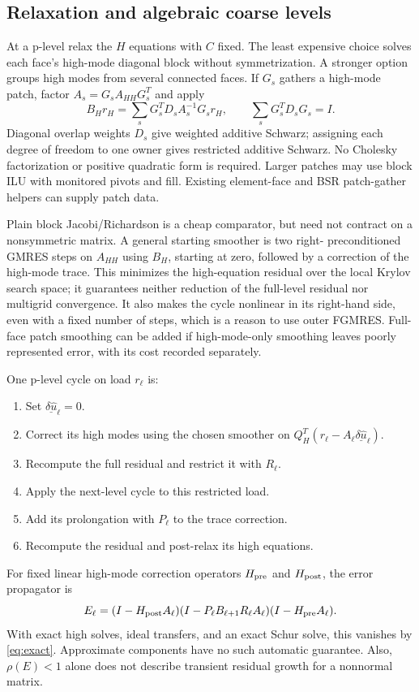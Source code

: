 \documentclass[11pt]{article}
\numberwithin{equation}{section}
\numberwithin{figure}{section}
\numberwithin{table}{section}
\begin{document}
\subsection{Relaxation and algebraic coarse levels}
At a p-level relax the $H$ equations with $C$ fixed. The least expensive
choice solves each face's high-mode diagonal block without symmetrization.
A stronger option groups high modes from several connected faces.
If $G_s$ gathers a high-mode patch, factor
$A_s=G_sA_{HH}G_s^T$ and apply
\[
 B_Hr_H=\sum_s G_s^TD_s A_s^{-1}G_sr_H,\qquad
 \sum_s G_s^TD_sG_s=I.
\]
Diagonal overlap weights $D_s$ give weighted additive Schwarz; assigning
each degree of freedom to one owner gives restricted additive Schwarz.
No Cholesky factorization or positive quadratic form is required.
Larger patches may use block ILU with monitored pivots and fill.
Existing element-face and BSR patch-gather helpers can supply patch data.

Plain block Jacobi/Richardson is a cheap comparator, but need not contract
on a nonsymmetric matrix. A general starting smoother is two right-
preconditioned GMRES steps on $A_{HH}$ using $B_H$, starting at zero,
followed by a correction of the high-mode trace. This minimizes the
high-equation residual over the local Krylov search space; it guarantees
neither reduction of the full-level residual nor multigrid convergence.
It also makes the cycle nonlinear in its right-hand side, even with a
fixed number of steps, which is a reason to use outer FGMRES.
Full-face patch smoothing can be added if high-mode-only smoothing leaves
poorly represented error, with its cost recorded separately.

One p-level cycle on load $r_\ell$ is:
\begin{enumerate}
 \item Set $\underline{\delta\widehat{u}}_\ell=0$.
 \item Correct its high modes using the chosen smoother on
 $Q_H^T(r_\ell-A_\ell\underline{\delta\widehat{u}}_\ell)$.
 \item Recompute the full residual and restrict it with $R_\ell$.
 \item Apply the next-level cycle to this restricted load.
 \item Add its prolongation with $P_\ell$ to the trace correction.
 \item Recompute the residual and post-relax its high equations.
\end{enumerate}
For fixed linear high-mode correction operators $H_{\rm pre}$ and
$H_{\rm post}$, the error propagator is
\[
 E_\ell=(I-H_{\rm post}A_\ell)
 (I-P_\ell B_{\ell+1}R_\ell A_\ell)
 (I-H_{\rm pre}A_\ell).
\]
With exact high solves, ideal transfers, and an exact Schur solve, this
vanishes by \eqref{eq:exact}. Approximate components have no such automatic
guarantee. Also, $\rho(E)<1$ alone does not describe transient residual
growth for a nonnormal matrix.
\end{document}
